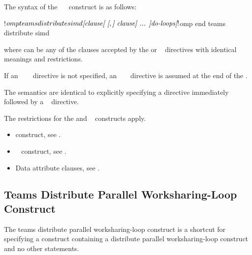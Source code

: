 \begin{fortranspecific}
The syntax of the ~~ construct is as follows:

\begin{ompfPragma}
!$omp teams distribute simd \plc{[clause[ [},\plc{] clause] ... ]}
    \plc{do-loops}
\plc{[}!$omp end teams distribute simd\plc{]}
\end{ompfPragma}

where  can be any of the clauses accepted by the  or ~
directives with identical meanings and restrictions.

If an ~~~ directive is
not specified, an ~ ~
directive is assumed at the end of the .
\end{fortranspecific}

\descr
The semantics are identical to explicitly specifying a  directive immediately
followed by a ~ directive.


\restrictions
The restrictions for the  and ~ constructs apply.

\crossreferences
\begin{itemize}
\item {} construct, see
.

\item {}~ construct, see
.

\item Data attribute clauses, see
.
\end{itemize}












\subsection{Teams Distribute Parallel Worksharing-Loop Construct}
\label{subsec:Teams Distribute Parallel Worksharing-Loop Construct}
\summary
The teams distribute parallel worksharing-loop construct is a shortcut for specifying a 
construct containing a distribute parallel worksharing-loop construct and no other statements.

